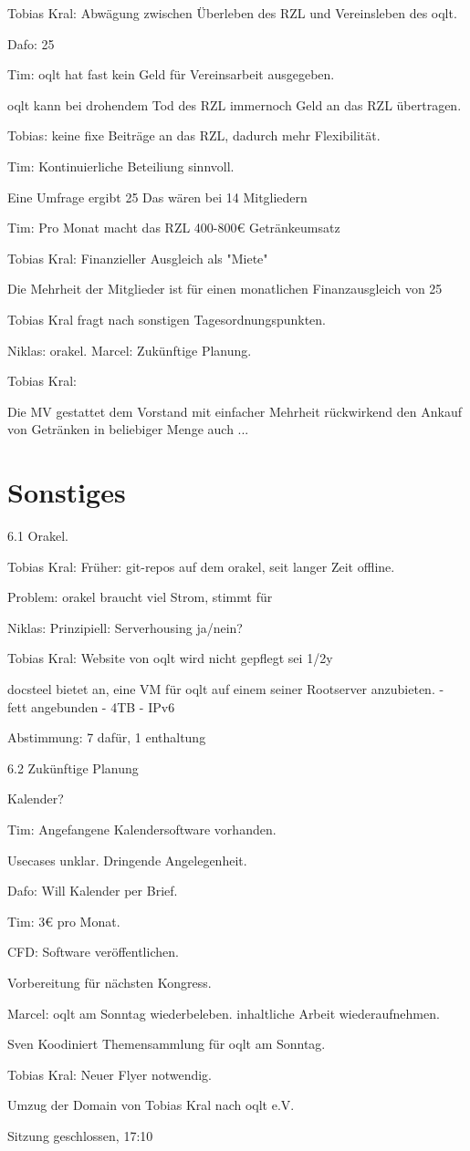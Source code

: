 \documentclass{scrartcl}
\begin{document}
{Tobias Kral: Abwägung zwischen Überleben des RZL und Vereinsleben des oqlt.

Dafo: 25%

Tim: oqlt hat fast kein Geld für Vereinsarbeit ausgegeben.

oqlt kann bei drohendem Tod des RZL immernoch Geld an das RZL übertragen.

Tobias: keine fixe Beiträge an das RZL, dadurch mehr Flexibilität.

Tim: Kontinuierliche Beteiliung sinnvoll.

Eine Umfrage ergibt 25%
Das wären bei 14 Mitgliedern 

Tim: Pro Monat macht das RZL 400-800€ Getränkeumsatz

Tobias Kral: Finanzieller Ausgleich als "Miete"

Die Mehrheit der Mitglieder ist für einen monatlichen Finanzausgleich von 25%

Tobias Kral fragt nach sonstigen Tagesordnungspunkten.

Niklas: orakel.
Marcel: Zukünftige Planung.

Tobias Kral:

Die MV gestattet dem Vorstand mit einfacher Mehrheit rückwirkend den Ankauf von Getränken in beliebiger Menge
auch ...

}
\section{Sonstiges}{

6.1 Orakel.

Tobias Kral:
Früher: git-repos auf dem orakel, seit langer Zeit offline.

Problem: orakel braucht viel Strom, stimmt für 

Niklas: Prinzipiell: Serverhousing ja/nein?

Tobias Kral: Website von oqlt wird nicht gepflegt sei 1/2y

docsteel bietet an, eine VM für oqlt auf einem seiner Rootserver anzubieten.
- fett angebunden
- 4TB
- IPv6

Abstimmung: 7 dafür, 1 enthaltung

6.2 Zukünftige Planung

Kalender?

Tim: Angefangene Kalendersoftware vorhanden.

Usecases unklar.
Dringende Angelegenheit.

Dafo: Will Kalender per Brief.

Tim: 3€ pro Monat.

CFD:
Software veröffentlichen.

Vorbereitung für nächsten Kongress.

Marcel:
oqlt am Sonntag wiederbeleben.
inhaltliche Arbeit wiederaufnehmen.

Sven Koodiniert Themensammlung für oqlt am Sonntag.

Tobias Kral: Neuer Flyer notwendig.

Umzug der Domain von Tobias Kral nach oqlt e.V.

Sitzung geschlossen, 17:10

}
\end{document}
